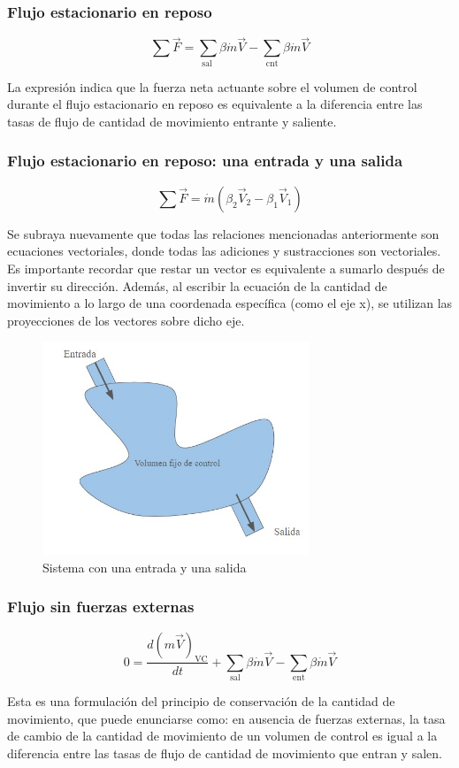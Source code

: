 \documentclass[10pt, oneside]{article}
\begin{document}
\subsubsection{Flujo estacionario en reposo}
\begin{equation}
\sum \vec{F}=\sum_{\text {sal }} \beta \dot{m} \vec{V}-\sum_{\mathrm{cnt}} \beta \dot{m} \vec{V}
\end{equation}

La expresión indica que la fuerza neta actuante sobre el volumen de control durante el flujo estacionario en reposo es equivalente a la diferencia entre las tasas de flujo de cantidad de movimiento entrante y saliente.

\subsubsection{Flujo estacionario en reposo: una entrada y una salida}
\begin{equation}
\sum \vec{F}=\dot{m}\left(\beta_2 \vec{V}_2-\beta_1 \vec{V}_1\right)
\end{equation}

Se subraya nuevamente que todas las relaciones mencionadas anteriormente son ecuaciones vectoriales, donde todas las adiciones y sustracciones son vectoriales. Es importante recordar que restar un vector es equivalente a sumarlo después de invertir su dirección. Además, al escribir la ecuación de la cantidad de movimiento a lo largo de una coordenada específica (como el eje x), se utilizan las proyecciones de los vectores sobre dicho eje.

\begin{figure}[h]
\centering
\includegraphics[width=8cm]{Fig.4.jpg}
\caption{Sistema con una entrada y una salida}
\label{eulan}
\end{figure}

\subsubsection{Flujo sin fuerzas externas}
\begin{equation}
0=\frac{d(m \vec{V})_{\mathrm{VC}}}{d t}+\sum_{\mathrm{sal}} \beta \dot{m} \vec{V}-\sum_{\mathrm{ent}} \beta \dot{m} \vec{V}
\end{equation}

Esta es una formulación del principio de conservación de la cantidad de movimiento, que puede enunciarse como: en ausencia de fuerzas externas, la tasa de cambio de la cantidad de movimiento de un volumen de control es igual a la diferencia entre las tasas de flujo de cantidad de movimiento que entran y salen.
\end{document}
